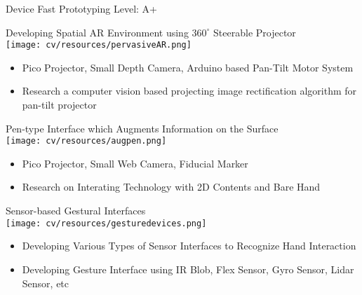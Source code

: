 \begin{cventries}
  \cventry
    {Device Fast Prototyping} %
    {} %
    {} %
    {Level: A+} %
    {
      \begin{cvitems} %
        \item {Developing Spatial AR Environment using $360^{\circ}$ Steerable Projector \\
          \texttt{[image: cv/resources/pervasiveAR.png]}
          \begin{itemize}
              \item {Pico Projector, Small Depth Camera, Arduino based Pan-Tilt Motor System}
              \item {Research a computer vision based projecting image rectification algorithm for pan-tilt projector}
          \end{itemize}
        }
        \item {Pen-type Interface which Augments Information on the Surface \\
          \texttt{[image: cv/resources/augpen.png]}
          \begin{itemize}
            \item {Pico Projector, Small Web Camera, Fiducial Marker}
            \item {Research on Interating Technology with 2D Contents and Bare Hand}
          \end{itemize}
        }
        \item {Sensor-based Gestural Interfaces \\
          \texttt{[image: cv/resources/gesturedevices.png]}
          \begin{itemize}
            \item {Developing Various Types of Sensor Interfaces to Recognize Hand Interaction}
            \item {Developing Gesture Interface using IR Blob, Flex Sensor, Gyro Sensor, Lidar Sensor, etc}
          \end{itemize}
        }
      \end{cvitems} 
    }
\end{cventries}
